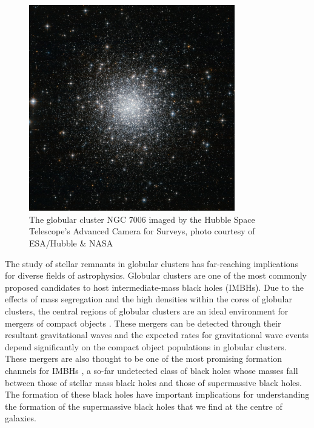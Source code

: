 \begin{figure}
	\centering
	\includegraphics[width=0.8\textwidth]{figures/c42.jpg}
	\caption{The globular cluster NGC 7006 imaged by the Hubble Space Telescope's Advanced
		Camera for Surveys, photo courtesy of ESA/Hubble \& NASA}
	\label{fig:1/ngc7006}
\end{figure}



The study of stellar remnants in globular clusters has far-reaching implications for diverse fields
of astrophysics. Globular clusters are one of the most commonly proposed candidates to host
intermediate-mass black holes (IMBHs). Due to the effects of mass segregation and the high densities
within the cores of globular clusters, the central regions of globular clusters are an ideal
environment for mergers of compact objects \citep{Rodriguez2021}. These mergers can be detected
through their resultant gravitational waves and the expected rates for gravitational wave events
depend significantly on the compact object populations in globular clusters. These mergers are also
thought to be one of the most promising formation channels for IMBHs \citep{Giersz2015}, a so-far
undetected class of black holes whose masses fall between those of stellar mass black holes and
those of supermassive black holes. The formation of these black holes have important implications
for understanding the formation of the supermassive black holes that we find at the centre of
galaxies.


